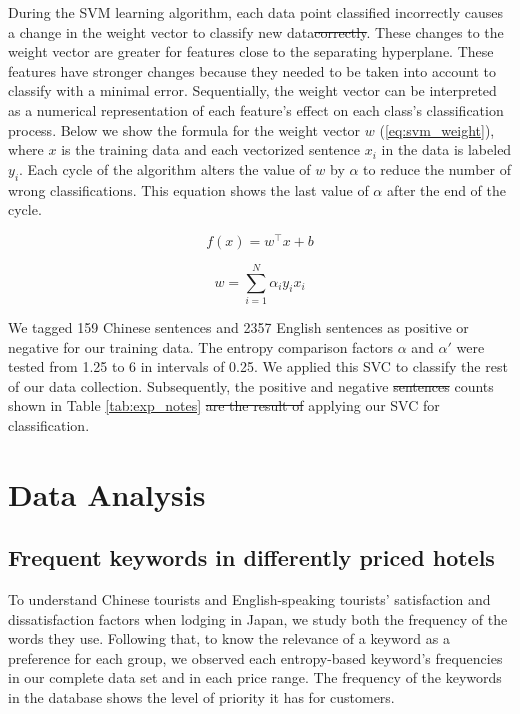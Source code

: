 \documentclass[smallextended,natbib]{svjour3}       %
\providecommand{\DIFadd}[1]{{\protect\color{blue}\uwave{#1}}} %
\providecommand{\DIFdel}[1]{{\protect\color{red}\sout{#1}}}                      %
\providecommand{\DIFaddbegin}{} %
\providecommand{\DIFaddend}{} %
\providecommand{\DIFdelbegin}{} %
\providecommand{\DIFdelend}{} %
\newcommand{\DIFscaledelfig}{0.5}
\newlength{\DIFdelgraphicswidth} %
\newlength{\DIFdelgraphicsheight} %
\newcommand{\DIFaddincludegraphics}[2][]{{\color{blue}\fbox{\DIFOincludegraphics[#1]{#2}}}} %
\newcommand{\DIFdelincludegraphics}[2][]{%
\sbox{\DIFdelgraphicsbox}{\DIFOincludegraphics[#1]{#2}}%
\settoboxwidth{\DIFdelgraphicswidth}{\DIFdelgraphicsbox} %
\settoboxtotalheight{\DIFdelgraphicsheight}{\DIFdelgraphicsbox} %
\scalebox{\DIFscaledelfig}{%
\parbox[b]{\DIFdelgraphicswidth}{\usebox{\DIFdelgraphicsbox}\\[-\baselineskip] \rule{\DIFdelgraphicswidth}{0em}}\llap{\resizebox{\DIFdelgraphicswidth}{\DIFdelgraphicsheight}{%
\setlength{\unitlength}{\DIFdelgraphicswidth}%
\begin{picture}(1,1)%
\thicklines\linethickness{2pt} %
{\color[rgb]{1,0,0}\put(0,0){\framebox(1,1){}}}%
{\color[rgb]{1,0,0}\put(0,0){\line( 1,1){1}}}%
{\color[rgb]{1,0,0}\put(0,1){\line(1,-1){1}}}%
\end{picture}%
}\hspace*{3pt}}} %
} %
\DeclareRobustCommand{\DIFaddbegin}{\DIFOaddbegin \let\includegraphics\DIFaddincludegraphics} %
\DeclareRobustCommand{\DIFaddend}{\DIFOaddend \let\includegraphics\DIFOincludegraphics} %
\DeclareRobustCommand{\DIFdelbegin}{\DIFOdelbegin \let\includegraphics\DIFdelincludegraphics} %
\DeclareRobustCommand{\DIFdelend}{\DIFOaddend \let\includegraphics\DIFOincludegraphics} %
\begin{document}
    During the SVM learning algorithm, each data point classified incorrectly causes a change in the weight vector to \DIFaddbegin \DIFadd{correctly }\DIFaddend classify new data\DIFdelbegin \DIFdel{correctly}\DIFdelend . These changes to the weight vector are greater for features close to the separating hyperplane. These features have stronger changes because they needed to be taken into account to classify with a minimal error. Sequentially, the weight vector can be interpreted as a numerical representation of each feature's effect on each class's classification process. Below we show the formula for the weight vector \(w\) (\ref{eq:svm_weight}), where \(x\) is the training data and each vectorized sentence \(x_i\) in the data is labeled \(y_i\). Each cycle of the algorithm alters the value of \(w\) by \(\alpha\) to reduce the number of wrong classifications. This equation shows the last value of \(\alpha\) after the end of the cycle.

    \begin{equation}\label{eq:svm1}
    f(x) = w^\top x + b
    \end{equation}

    \begin{equation}\label{eq:svm_weight}
    w = \sum_{i=1}^N \alpha_i y_i x_i
    \end{equation}

    We tagged 159 Chinese sentences and \num[group-separator={,}]{2357} English sentences as positive or negative for our training data. The entropy comparison factors \(\alpha\) and \(\alpha'\) were tested from 1.25 to 6 in intervals of 0.25. We applied this SVC to classify the rest of our data collection. Subsequently, the positive and negative \DIFdelbegin \DIFdel{sentences }\DIFdelend \DIFaddbegin \DIFadd{sentence }\DIFaddend counts shown in Table \ref{tab:exp_notes} \DIFdelbegin \DIFdel{are the result of }\DIFdelend \DIFaddbegin \DIFadd{result from }\DIFaddend applying our SVC for classification.

\section{Data Analysis}\label{dataanalysis}

  \subsection{Frequent keywords in differently priced hotels}\label{svmresults}

    To understand Chinese tourists and English-speaking tourists' satisfaction and dissatisfaction factors when lodging in Japan, we study both the frequency of the words they use. Following that, to know the relevance of a keyword as a preference for each group, we observed each entropy-based keyword's frequencies in our complete data set and in each price range. The frequency of the keywords in the database shows the level of priority it has for customers.
\end{document}
